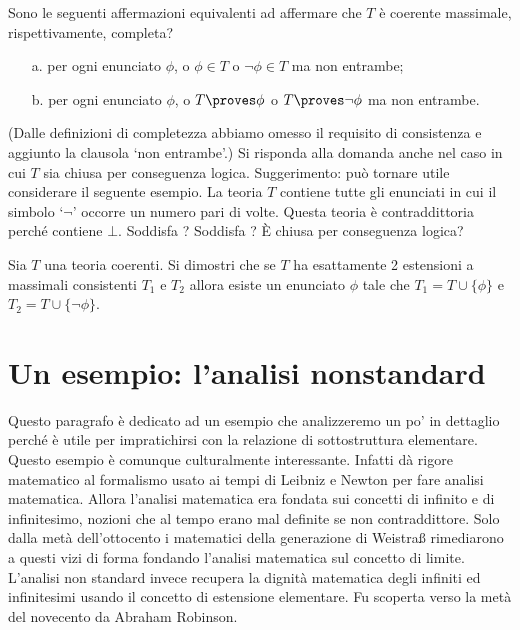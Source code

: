 \begin{exercise}
Sono le seguenti affermazioni equivalenti ad affermare che $T$ \`e coerente massimale, rispettivamente, completa?
\begin{itemize}
\item[a.] per ogni enunciato $\phi$, o $\phi\in T$ o  $\neg\phi\in T$ ma non entrambe;
\item[b.] per ogni enunciato $\phi$, o $T\proves\phi$ o  $T\proves\neg\phi$ ma non entrambe.
\end{itemize}
(Dalle definizioni di completezza abbiamo omesso il requisito di consistenza e aggiunto la clausola `non entrambe'.)
Si risponda alla domanda anche nel caso in cui $T$ sia chiusa per conseguenza logica. Suggerimento: pu\`o tornare utile considerare il seguente esempio. La teoria $T$ contiene tutte gli enunciati in cui il simbolo `$\neg$' occorre un numero pari di volte. Questa teoria \`e contraddittoria perch\'e contiene $\bot$. Soddisfa ? Soddisfa ? \`E chiusa per conseguenza logica?\QED
\end{exercise}

\begin{exercise}
Sia $T$ una teoria coerenti. Si dimostri che se $T$ ha esattamente 2 estensioni a massimali consistenti $T_1$ e $T_2$ allora esiste un enunciato $\phi$ tale che $T_1=T\cup\{\phi\}$ e $T_2=T\cup\{\neg\phi\}$.\QED
\end{exercise}

\section{Un esempio: l'analisi nonstandard}
\label{nonstandard}

Questo paragrafo \`e dedicato ad un esempio che analizzeremo un po' in dettaglio perch\'e \`e utile per impratichirsi con la relazione di sottostruttura elementare. Questo esempio \`e comunque culturalmente interessante. Infatti d\`a rigore matematico al formalismo usato ai tempi di Leibniz e Newton per fare analisi matematica. Allora l'analisi matematica era fondata sui concetti di infinito e di infinitesimo, nozioni che al tempo erano mal definite se non contraddittore. Solo dalla met\`a dell'ottocento i matematici della generazione di Weistra\ss{} rimediarono a questi vizi di forma fondando l'analisi matematica sul concetto di limite. L'analisi non standard invece recupera la dignit\`a matematica degli infiniti ed infinitesimi usando il concetto di estensione elementare. Fu scoperta verso la met\`a del novecento da Abraham Robinson.

